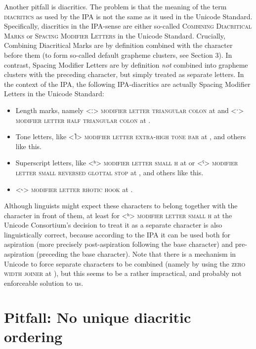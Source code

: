 Another pitfall is diacritics. The problem is that the meaning of the term
\textsc{diacritics} as used by the IPA is not the same as it used in the Unicode
Standard. Specifically, diacritics in the IPA-sense are either so-called
\textsc{Combining Diacritical Marks} or \textsc{Spacing Modifier Letters} in the
Unicode Standard. Crucially, Combining Diacritical Marks are by definition
combined with the character before them (to form so-called default grapheme
clusters, see Section 3). In contrast, Spacing Modifier Letters are by
definition \emph{not} combined into grapheme clusters with the preceding
character, but simply treated as separate letters. In the context of the IPA,
the following IPA-diacritics are actually Spacing Modifier Letters in the
Unicode Standard:

\begin{itemize}
	\item Length marks, namely <ː> \textsc{modifier letter triangular colon} at  and <ˑ> \textsc{modifier letter half triangular colon} at . 
	\item Tone letters, like <˥> \textsc{modifier letter extra-high tone bar} at , and others like this. 
	\item Superscript letters, like <ʰ> \textsc{modifier letter small h} at  or <ˤ> \textsc{modifier letter small reversed glottal stop} at , and others like this. 
	\item <˞> \textsc{modifier letter rhotic hook} at . 
\end{itemize}

Although linguists might expect these characters to belong together with the
character in front of them, at least for <ʰ> \textsc{modifier letter small h} at
 the Unicode Consortium's decision to treat it as a separate character
is also linguistically correct, because according to the IPA it can be used both
for aspiration (more precisely post-aspiration following the base character) and
pre-aspiration (preceding the base character). Note that there is a mechanism in
Unicode to force separate characters to be combined (namely by using the
\textsc{zero width joiner} at ), but this seems to be a rather
impractical, and probably not enforceable solution to us.

\section{Pitfall: No unique diacritic ordering}
\label{pitfall-no-unique-diacritic-ordering}

